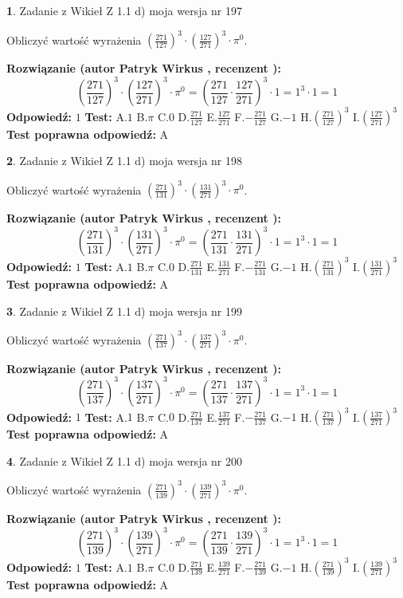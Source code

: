 \documentclass[12pt, a4paper]{article}
\theoremstyle{definition} %
\newtheorem{zad}{}
\newcommand{\zadStart}[1]{\begin{zad}#1\newline}
\newcommand{\zadStop}{\end{zad}}
\newcommand{\rozwStart}[2]{\noindent \textbf{Rozwiązanie (autor #1 , recenzent #2): }\newline}
\newcommand{\rozwStop}{\newline}
\newcommand{\odpStart}{\noindent \textbf{Odpowiedź:}\newline}
\newcommand{\odpStop}{\newline}
\newcommand{\testStart}{\noindent \textbf{Test:}\newline}
\newcommand{\testStop}{\newline}
\newcommand{\kluczStart}{\noindent \textbf{Test poprawna odpowiedź:}\newline}
\newcommand{\kluczStop}{\newline}
\begin{document}
\zadStart{Zadanie z Wikieł Z 1.1 d) moja wersja nr 197}

Obliczyć wartość wyrażenia $(\frac{271}{127})^{3} \cdot (\frac{127}{271})^{3} \cdot \pi^{0}$.
\zadStop
\rozwStart{Patryk Wirkus}{}
$$(\frac{271}{127})^{3} \cdot (\frac{127}{271})^{3} \cdot \pi^{0} = (\frac{271}{127} \cdot \frac{127}{271})^{3} \cdot 1 = 1^{3} \cdot 1 = 1$$
\rozwStop
\odpStart
$1$
\odpStop
\testStart
A.$1$ B.$\pi$ C.$0$ D.$\frac{271}{127}$ E.$\frac{127}{271}$
F.$-\frac{271}{127}$ G.$-1$
H.$(\frac{271}{127})^{3}$
I.$(\frac{127}{271})^{3}$
\testStop
\kluczStart
A
\kluczStop



\zadStart{Zadanie z Wikieł Z 1.1 d) moja wersja nr 198}

Obliczyć wartość wyrażenia $(\frac{271}{131})^{3} \cdot (\frac{131}{271})^{3} \cdot \pi^{0}$.
\zadStop
\rozwStart{Patryk Wirkus}{}
$$(\frac{271}{131})^{3} \cdot (\frac{131}{271})^{3} \cdot \pi^{0} = (\frac{271}{131} \cdot \frac{131}{271})^{3} \cdot 1 = 1^{3} \cdot 1 = 1$$
\rozwStop
\odpStart
$1$
\odpStop
\testStart
A.$1$ B.$\pi$ C.$0$ D.$\frac{271}{131}$ E.$\frac{131}{271}$
F.$-\frac{271}{131}$ G.$-1$
H.$(\frac{271}{131})^{3}$
I.$(\frac{131}{271})^{3}$
\testStop
\kluczStart
A
\kluczStop



\zadStart{Zadanie z Wikieł Z 1.1 d) moja wersja nr 199}

Obliczyć wartość wyrażenia $(\frac{271}{137})^{3} \cdot (\frac{137}{271})^{3} \cdot \pi^{0}$.
\zadStop
\rozwStart{Patryk Wirkus}{}
$$(\frac{271}{137})^{3} \cdot (\frac{137}{271})^{3} \cdot \pi^{0} = (\frac{271}{137} \cdot \frac{137}{271})^{3} \cdot 1 = 1^{3} \cdot 1 = 1$$
\rozwStop
\odpStart
$1$
\odpStop
\testStart
A.$1$ B.$\pi$ C.$0$ D.$\frac{271}{137}$ E.$\frac{137}{271}$
F.$-\frac{271}{137}$ G.$-1$
H.$(\frac{271}{137})^{3}$
I.$(\frac{137}{271})^{3}$
\testStop
\kluczStart
A
\kluczStop



\zadStart{Zadanie z Wikieł Z 1.1 d) moja wersja nr 200}

Obliczyć wartość wyrażenia $(\frac{271}{139})^{3} \cdot (\frac{139}{271})^{3} \cdot \pi^{0}$.
\zadStop
\rozwStart{Patryk Wirkus}{}
$$(\frac{271}{139})^{3} \cdot (\frac{139}{271})^{3} \cdot \pi^{0} = (\frac{271}{139} \cdot \frac{139}{271})^{3} \cdot 1 = 1^{3} \cdot 1 = 1$$
\rozwStop
\odpStart
$1$
\odpStop
\testStart
A.$1$ B.$\pi$ C.$0$ D.$\frac{271}{139}$ E.$\frac{139}{271}$
F.$-\frac{271}{139}$ G.$-1$
H.$(\frac{271}{139})^{3}$
I.$(\frac{139}{271})^{3}$
\testStop
\kluczStart
A
\kluczStop
\end{document}
